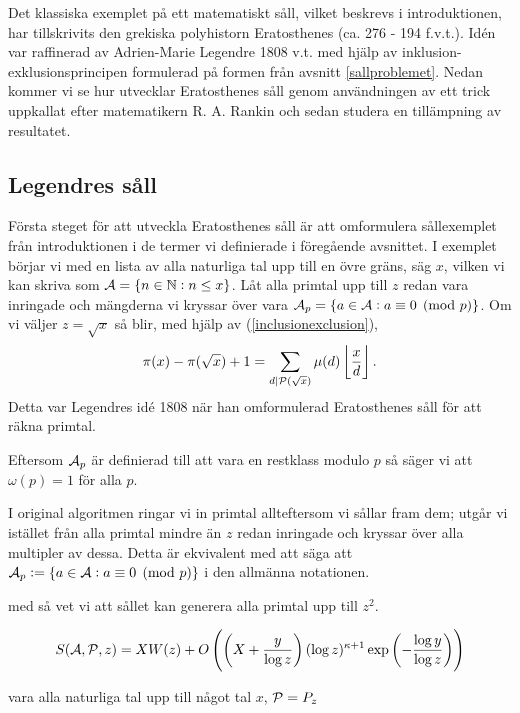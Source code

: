 
Det klassiska exemplet på ett matematiskt såll, vilket beskrevs i introduktionen, har tillskrivits den grekiska polyhistorn Eratosthenes (ca. 276 - 194 f.v.t.). Idén var raffinerad av Adrien-Marie Legendre 1808 v.t. med hjälp av inklusion-exklusionsprincipen formulerad på formen från avsnitt \ref{sallproblemet}. Nedan kommer vi se hur \cite{cojocarumurty} utvecklar Eratosthenes såll genom användningen av ett trick uppkallat efter matematikern R. A. Rankin och sedan studera en tillämpning av resultatet. 

\subsection{Legendres såll}

Första steget för att utveckla Eratosthenes såll är att omformulera sållexemplet från introduktionen i de termer vi definierade i föregående avsnittet. I exemplet börjar vi med en lista av alla naturliga tal upp till en övre gräns, säg $x$, vilken vi kan skriva som $\A = \{n \in \mathbb{N} : n \leq x\}$. Låt alla primtal upp till $z$ redan vara inringade och mängderna vi kryssar över vara \(\A_p = \{a \in \A :  a \equiv 0 \pmod{p}\}\). Om vi väljer $z = \sqrt{x}$ så blir, med hjälp av (\ref{inclusionexclusion}),
\begin{align*}
    \pi(x) - \pi(\sqrt{x}) + 1 = \sum_{d \divides \P(\sqrt{x})} \mu(d) \left\lfloor \frac{x}{d} \right\rfloor . 
\end{align*}
Detta var Legendres idé 1808 när han omformulerad Eratosthenes såll för att räkna primtal. 

Eftersom \(\A_p\) är definierad till att vara en restklass modulo $p$ så säger vi att $\omega(p) = 1$ för alla $p$. 

I original algoritmen ringar vi in primtal allteftersom vi sållar fram dem; utgår vi istället från alla primtal mindre än \(z\) redan inringade och kryssar över alla multipler av dessa. Detta är ekvivalent med att säga att \(\A_p := \{a \in \A : a \equiv 0 \pmod{p}\}\) i den allmänna notationen.

med  så vet vi att sållet kan generera alla primtal upp till \(z^2\).

\begin{theorem}\label{thm:EratosthenesSieve}

\begin{align*}
    \S{A}{P}{z} = X W(z) + O\left(\left(X + \frac{y}{\log z} \right) (\log z)^{\kappa + 1} \exp{\left(-\frac{\log y}{\log z}\right)} \right)
\end{align*}

\end{theorem}

vara alla naturliga tal upp till något tal $x$, $\P = P_z$ 